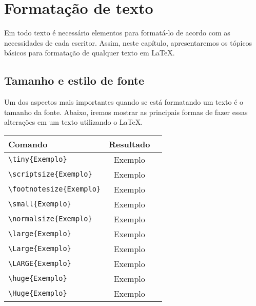 %
%
%
\chapter{Formatação de texto}
\label{intro} %

Em todo texto é necessário elementos para format\'a-lo de acordo com as necessidades de cada escritor. Assim,
neste capítulo, apresentaremos os tópicos básicos para formatação de qualquer texto em \LaTeX{}.

\section{Tamanho e estilo de fonte}
\label{sec:1}
Um dos aspectos mais importantes quando se está formatando um texto é o tamanho da fonte. Abaixo, iremos mostrar as principais formas de fazer essas alterações em um texto utilizando o \LaTeX{}.\\

\begin{center}
	\begin{tabular}{lcc}
		\hline
	\textbf{Comando}	&  \textbf{Resultado}\\
		\hline
	\verb|\tiny{Exemplo}| &  \tiny Exemplo\\ 
		\hline
	\verb|\scriptsize{Exemplo}|	& \scriptsize Exemplo \\
		\hline
	\verb|\footnotesize{Exemplo}|	&  \footnotesize Exemplo\\
		\hline
	\verb|\small{Exemplo}|	& \small Exemplo \\
		\hline
	\verb|\normalsize{Exemplo}|	& \normalsize Exemplo \\
		\hline
	\verb|\large{Exemplo}|	& \large Exemplo \\
		\hline
	\verb|\Large{Exemplo}|	& \Large Exemplo \\
		\hline
	\verb|\LARGE{Exemplo}|	& \LARGE Exemplo \\
		\hline
	\verb|\huge{Exemplo}|	& \huge Exemplo \\
		\hline
	\verb|\Huge{Exemplo}|	& \Huge Exemplo \\
		\hline
	\end{tabular}
\end{center}

